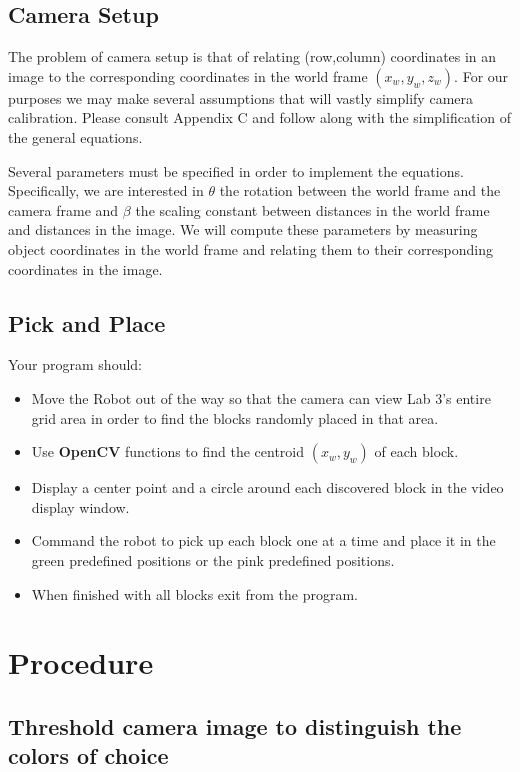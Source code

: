 \subsection{Camera Setup}
The problem of camera setup is that of relating (row,column) coordinates in an image to the corresponding coordinates in the world frame $(x_w,y_w,z_w)$. For our purposes we may make several assumptions that will vastly simplify camera calibration. Please consult Appendix C and follow along with the simplification of the general equations.

Several parameters must be specified in order to implement the equations. Specifically, we are interested in \textbf{$\theta$} the rotation between the world frame and the camera frame and \textbf{$\beta$} the scaling constant between distances in the world frame and distances in the image. We will compute these parameters by measuring object coordinates in the world frame and relating them to their corresponding coordinates in the image.

\subsection{Pick and Place}
Your program should:

\begin{itemize}
\item Move the Robot out of the way so that the camera can view Lab 3's entire grid area in order to find the blocks randomly placed in that area.  

\item Use \textbf{OpenCV} functions to find the centroid $(x_w,y_w)$ of each block.

\item Display a center point and a circle around each discovered block in the video display window.  

\item Command the robot to pick up each block one at a time and place it in the green predefined positions or the pink predefined positions. 

\item When finished with all blocks exit from the program.  

\end{itemize}

\section{Procedure}
\subsection{Threshold camera image to distinguish the colors of choice} \label{ObjCentriod}

